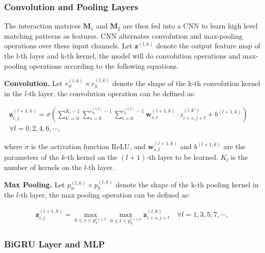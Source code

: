 \subsubsection{\textbf{Convolution and Pooling Layers}}
The interaction matrices $\mathbf{M}_1$ and $\mathbf{M}_2$ are then fed into a CNN to learn high level matching patterns as features. CNN alternates convolution and max-pooling operations over these input channels. Let $\mathbf{z}^{(l,k)}$ denote the output feature map of the l-th layer and k-th kernel, the model will do convolution operations and max-pooling operations according to the following equations.

\textbf{Convolution.} Let $r_w^{(l,k)} \times r_h^{(l,k)}$  denote the shape of the k-th convolution kernel in the $l$-th layer, the convolution operation can be defined as:
 \begin{footnotesize}
\begin{equation} \label{Eqn:2d_conv}
\begin{aligned}
\mathbf{z}_{i,j}^{(l+1, k)}=\sigma(\sum_{k'=0}^{K_l -1}\sum_{s=0}^{r_w^{(l,k)} - 1}\sum_{t=0}^{r_h^{(l,k)} - 1} \mathbf{w}_{s,t}^{(l+1,k)} \cdot z_{i+s, j+t}^{(l,k')} + b^{(l+1,k)}  )  \quad  \\ 
\forall l =0,2,4,6,\cdots,  
\end{aligned}
\end{equation}
\end{footnotesize}
where $\sigma$ is the activation function ReLU, and $\mathbf{w}_{s,t}^{(l+1,k)}$ and $b^{(l+1,k)}$ are the parameters of the $k$-th kernel on the $(l+1)$-th layer to be learned.  $K_l$ is the number of kernels on the $l$-th layer. 

\textbf{Max Pooling.} Let $p_w^{(l,k)} \times p_h^{(l,k)}$  denote the shape of the k-th pooling kernel in the $l$-th layer, the max pooling operation can be defined as:
 \begin{footnotesize}
\begin{equation} \label{Eqn:2d_max_pooling}
\begin{aligned}
\mathbf{z}_{i,j}^{(l+1,k)} = \max_{0\le s < p_w^{l+1, k}} \max_{0\le t < p_h^{l+1, k}} \mathbf{z}_{i+s,j+t}^{(l,k)} \quad \forall  l = 1,3,5,7, \cdots, 
\end{aligned}
\end{equation}
\end{footnotesize}
\subsubsection{\textbf{BiGRU Layer and MLP}}

